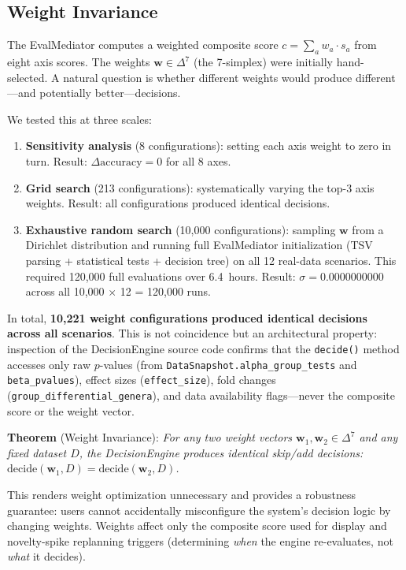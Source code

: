 \documentclass[11pt,a4paper]{article}
\begin{document}
\subsection{Weight Invariance}
\label{sec:eval-weight}

The EvalMediator computes a weighted composite score
$c = \sum_a w_a \cdot s_a$ from eight axis scores.
The weights $\mathbf{w} \in \Delta^7$ (the 7-simplex) were
initially hand-selected.
A natural question is whether different weights would produce
different---and potentially better---decisions.

We tested this at three scales:
\begin{enumerate}
  \item \textbf{Sensitivity analysis} (8 configurations):
    setting each axis weight to zero in turn.
    Result: $\Delta\text{accuracy} = 0$ for all 8 axes.
  \item \textbf{Grid search} (213 configurations):
    systematically varying the top-3 axis weights.
    Result: all configurations produced identical decisions.
  \item \textbf{Exhaustive random search} (10,000 configurations):
    sampling $\mathbf{w}$ from a Dirichlet distribution and running
    full EvalMediator initialization (TSV parsing + statistical tests
    + decision tree) on all 12 real-data scenarios.
    This required 120,000 full evaluations over 6.4~hours.
    Result: $\sigma = 0.0000000000$ across all 10,000 $\times$ 12
    = 120,000 runs.
\end{enumerate}

In total, \textbf{10,221 weight configurations produced
identical decisions across all scenarios}.
This is not coincidence but an architectural property:
inspection of the DecisionEngine source code confirms that the
\texttt{decide()} method accesses only raw $p$-values
(from \texttt{DataSnapshot.alpha\_group\_tests} and
\texttt{beta\_pvalues}), effect sizes (\texttt{effect\_size}),
fold changes (\texttt{group\_differential\_genera}), and data
availability flags---never the composite score or the weight vector.

\textbf{Theorem} (Weight Invariance): \textit{For any two weight
vectors $\mathbf{w}_1, \mathbf{w}_2 \in \Delta^7$ and any fixed
dataset $D$, the DecisionEngine produces identical skip/add
decisions: $\mathrm{decide}(\mathbf{w}_1, D) = \mathrm{decide}(\mathbf{w}_2, D)$.}

This renders weight optimization unnecessary and provides a
robustness guarantee: users cannot accidentally misconfigure the
system's decision logic by changing weights.
Weights affect only the composite score used for display and
novelty-spike replanning triggers (determining \textit{when} the
engine re-evaluates, not \textit{what} it decides).
\end{document}
